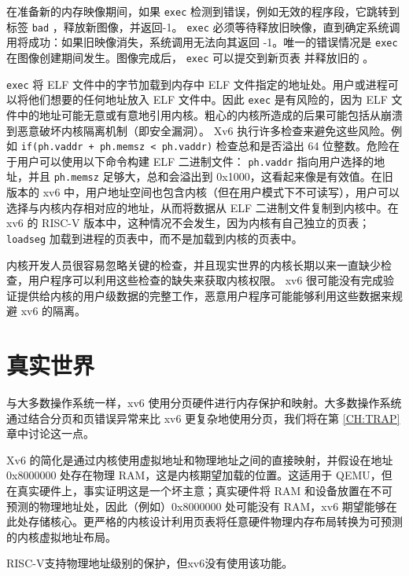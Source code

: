 在准备新的内存映像期间，如果
    \lstinline{exec}    检测到错误，例如无效的程序段，它跳转到标签
    \lstinline{bad}    ，释放新图像，并返回-1。
    \lstinline{exec}    必须等待释放旧映像，直到确定系统调用将成功：如果旧映像消失，系统调用无法向其返回 -1。唯一的错误情况是
    \lstinline{exec}    在图像创建期间发生。图像完成后，
    \lstinline{exec}   可以提交到新页表
        并释放旧的
        。  

   \lstinline{exec}    将 ELF 文件中的字节加载到内存中 ELF 文件指定的地址处。用户或进程可以将他们想要的任何地址放入 ELF 文件中。因此
    \lstinline{exec}    是有风险的，因为 ELF 文件中的地址可能无意或有意地引用内核。粗心的内核所造成的后果可能包括从崩溃到恶意破坏内核隔离机制（即安全漏洞）。 Xv6 执行许多检查来避免这些风险。例如
    \lstinline{if(ph.vaddr + ph.memsz < ph.vaddr)}    检查总和是否溢出 64 位整数。危险在于用户可以使用以下命令构建 ELF 二进制文件：
    \lstinline{ph.vaddr}    指向用户选择的地址，并且
    \lstinline{ph.memsz}    足够大，总和会溢出到 0x1000，这看起来像是有效值。在旧版本的 xv6 中，用户地址空间也包含内核（但在用户模式下不可读写），用户可以选择与内核内存相对应的地址，从而将数据从 ELF 二进制文件复制到内核中。在 xv6 的 RISC-V 版本中，这种情况不会发生，因为内核有自己独立的页表；
    \lstinline{loadseg}    加载到进程的页表中，而不是加载到内核的页表中。  

内核开发人员很容易忽略关键的检查，并且现实世界的内核长期以来一直缺少检查，用户程序可以利用这些检查的缺失来获取内核权限。 xv6 很可能没有完成验证提供给内核的用户级数据的完整工作，恶意用户程序可能能够利用这些数据来规避 xv6 的隔离。
    \section{真实世界  }     

与大多数操作系统一样，xv6 使用分页硬件进行内存保护和映射。大多数操作系统通过结合分页和页错误异常来比 xv6 更复杂地使用分页，我们将在第    \ref{CH:TRAP}    章中讨论这一点。  

Xv6 的简化是通过内核使用虚拟地址和物理地址之间的直接映射，并假设在地址 0x8000000 处存在物理 RAM，这是内核期望加载的位置。这适用于 QEMU，但在真实硬件上，事实证明这是一个坏主意；真实硬件将 RAM 和设备放置在不可预测的物理地址处，因此（例如）0x8000000 处可能没有 RAM，xv6 期望能够在此处存储核心。更严格的内核设计利用页表将任意硬件物理内存布局转换为可预测的内核虚拟地址布局。  

RISC-V支持物理地址级别的保护，但xv6没有使用该功能。  

